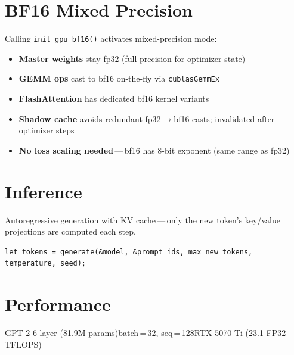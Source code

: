 \documentclass[11pt,a4paper]{article}
\begin{document}
\section{BF16 Mixed Precision}

Calling \texttt{init\_gpu\_bf16()} activates mixed-precision mode:

\begin{itemize}[leftmargin=1.5em, itemsep=3pt, label={\color{blue}\textbullet}]
  \item \textbf{Master weights} stay fp32 (full precision for optimizer state)
  \item \textbf{GEMM ops} cast to bf16 on-the-fly via \texttt{cublasGemmEx}
  \item \textbf{FlashAttention} has dedicated bf16 kernel variants
  \item \textbf{Shadow cache} avoids redundant fp32$\to$bf16 casts; invalidated after optimizer steps
  \item \textbf{No loss scaling needed}\,---\,bf16 has 8-bit exponent (same range as fp32)
\end{itemize}

\section{Inference}

Autoregressive generation with KV cache\,---\,only the new token's key/value projections are computed each step.

\vspace{0.3em}
\begin{lstlisting}
let tokens = generate(&model, &prompt_ids, max_new_tokens, temperature, seed);
\end{lstlisting}

\section{Performance}

\vspace{0.1em}
{\small\color{muted}GPT-2 6-layer (81.9M params)\enspace\textbullet\enspace batch\,=\,32, seq\,=\,128\enspace\textbullet\enspace RTX 5070 Ti (23.1 FP32 TFLOPS)}
\end{document}
